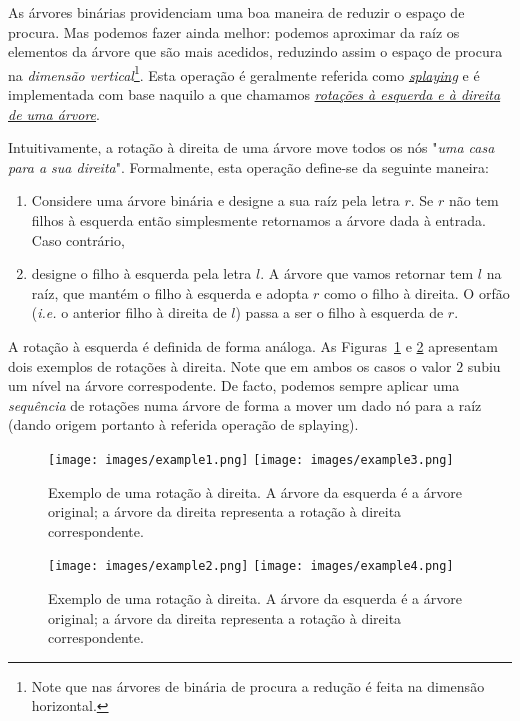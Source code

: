 \documentclass[a4paper]{article}
\begin{document}
\smallskip
  \noindent
    As árvores binárias providenciam uma boa maneira de reduzir o espaço
    de procura. Mas podemos fazer ainda melhor: podemos aproximar da
    raíz os elementos da árvore que são mais acedidos, reduzindo assim
    o espaço de procura na \emph{dimensão vertical}\footnote{Note que
    nas árvores de binária de procura a redução é feita na dimensão
    horizontal.}. Esta operação é geralmente
    referida como
    \href{https://en.wikipedia.org/wiki/Splay_tree}{\emph{splaying}} e
    é implementada com base naquilo a que chamamos
    \href{https://en.wikipedia.org/wiki/Tree_rotation}{\emph{rotações à esquerda
    e à direita de uma  árvore}}.

    Intuitivamente, a rotação à direita de uma árvore move todos os
    nós "\emph{uma casa para a sua direita}". Formalmente,
    esta operação define-se da seguinte maneira:
    \begin{enumerate}
       \item Considere uma árvore binária e designe a sua
       raíz pela letra $r$. Se $r$ não tem filhos à esquerda então simplesmente
       retornamos a árvore dada à entrada. Caso contrário,
       \item designe o filho à esquerda pela letra $l$. A árvore
       que vamos retornar tem $l$ na raíz, que mantém o filho à esquerda
       e adopta $r$ como o filho à direita. O orfão (\emph{i.e.} o anterior
       filho à direita de $l$) passa a ser o filho à esquerda de $r$.
    \end{enumerate}
    A rotação à esquerda é definida de forma análoga. As
       Figuras~\ref{exrot:fig} e \ref{exrot2:fig} apresentam dois
       exemplos de rotações à direita. Note que em ambos os casos o
       valor $2$ subiu um nível na árvore correspodente. De facto,
       podemos sempre aplicar uma \emph{sequência} de rotações numa
       árvore de forma a mover um dado nó para a raíz (dando origem
       portanto à referida operação de splaying).

    \begin{figure}
    \texttt{[image: images/example1.png]}
    \texttt{[image: images/example3.png]}
    \caption{Exemplo de uma rotação à direita. A árvore da esquerda
    é a árvore original; a árvore da direita representa a rotação à direita
    correspondente.}
    \label{exrot:fig}
    \end{figure}

    \begin{figure}
    \texttt{[image: images/example2.png]}
    \texttt{[image: images/example4.png]}
    \caption{Exemplo de uma rotação à direita. A árvore da esquerda
    é a árvore original; a árvore da direita representa a rotação à direita
    correspondente.}
    \label{exrot2:fig}
    \end{figure}
\end{document}
